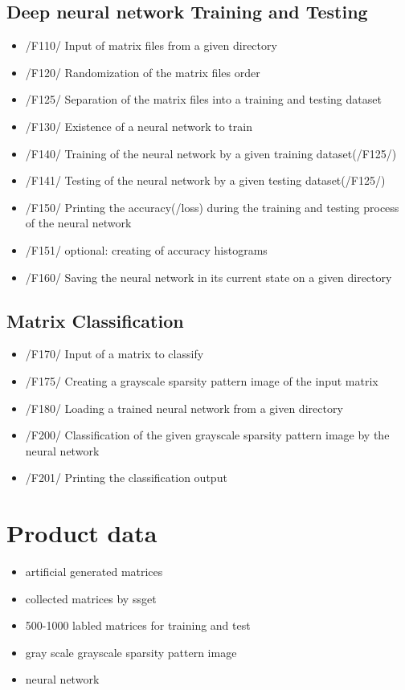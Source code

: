 \documentclass[parskip=full]{scrartcl}
\begin{document}
\subsection{Deep \gls{neural network} Training and Testing}
	\begin{itemize}
	\item /F110/ Input of matrix files from a given directory
	\item /F120/ Randomization of the matrix files order
	\item /F125/ Separation of the matrix files into a training and testing dataset
	\item /F130/ Existence of a \gls{neural network} to train
	\item /F140/ Training of the \gls{neural network} by a given training dataset(/F125/)
	\item /F141/ Testing of the \gls{neural network} by a given testing dataset(/F125/)
	\item /F150/ Printing the accuracy(/loss) during the training and testing process of the \gls{neural network}
	\item /F151/ optional: creating of accuracy histograms
	\item /F160/ Saving the \gls{neural network} in its current state on a given directory
	\end{itemize}
 	
\subsection{Matrix Classification}
	\begin{itemize}
	\item /F170/ Input of a matrix to classify
	\item /F175/ Creating a \gls{grayscale sparsity pattern image} of the input matrix
	\item /F180/ Loading a trained \gls{neural network} from a given directory
	\item /F200/ Classification of the given \gls{grayscale sparsity pattern image} by the \gls{neural network}
	\item /F201/ Printing the classification output
	\end{itemize}

\section{Product data}
	\begin{itemize}
	\item artificial generated matrices
	\item collected matrices by \gls{ssget}
	\item 500-1000 labled matrices for training and test
	\item gray scale \gls{grayscale sparsity pattern image}
	\item \gls{neural network}

	\end{itemize}
\end{document}
